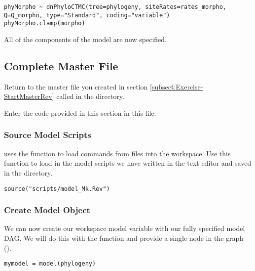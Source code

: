 {\tt \begin{snugshade*}
\begin{lstlisting}
phyMorpho ~ dnPhyloCTMC(tree=phylogeny, siteRates=rates_morpho, Q=Q_morpho, type="Standard", coding="variable")
phyMorpho.clamp(morpho)
\end{lstlisting}
\end{snugshade*}}

All of the components of the model are now specified. \par

\subsection{Complete Master \Rev File}\label{subsect:Exercise-CompleteMCMC}

{\begin{framed}
Return to the master \Rev file you created in section \ref{subsect:Exercise-StartMasterRev} called {\textcolor{red}{}} in the  directory.

Enter the \Rev code provided in this section in this file.
\end{framed}}

\medskip
\subsubsection{Source Model Scripts}\label{subsub:Exercise-SourceMods}

\RevBayes uses the  function to load commands from \Rev files into the workspace.
Use this function to load in the model scripts we have written in the text editor and saved in the  directory.
{\tt \begin{snugshade*}
\begin{lstlisting}
source("scripts/model_Mk.Rev")

\end{lstlisting}
\end{snugshade*}}


\medskip
\subsubsection{Create Model Object}\label{subsub:Exercise-ModObj}

We can now create our workspace model variable with our fully specified model DAG. 
We will do this with the  function and provide a single node in the graph ().
{\tt \begin{snugshade*}
\begin{lstlisting}
mymodel = model(phylogeny)
\end{lstlisting}
\end{snugshade*}}

